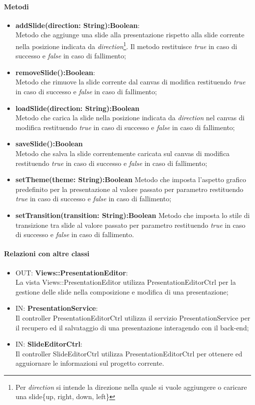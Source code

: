 	\paragraph{Metodi}
	\begin{itemize}
		\item \textbf{addSlide(direction: String):Boolean}:\\
			Metodo che aggiunge una slide alla presentazione rispetto alla slide corrente nella posizione indicata da \textit{direction}\footnote{Per \textit{direction} si intende la direzione nella quale si vuole aggiungere o caricare una slide\{up, right, down, left\}}. Il metodo restituisce \textit{true} in caso di successo e \textit{false} in caso di fallimento;
		\item \textbf{removeSlide():Boolean}:\\
			Metodo che rimuove la slide corrente dal canvas di modifica restituendo \textit{true} in caso di successo e \textit{false} in caso di fallimento;
		\item \textbf{loadSlide(direction: String):Boolean}\\
			Metodo che carica la slide nella posizione indicata da \textit{direction} nel canvas di modifica restituendo \textit{true} in caso di successo e \textit{false} in caso di fallimento;
		\item \textbf{saveSlide():Boolean}\\
			Metodo che salva la slide correntemente caricata sul canvas di modifica restituendo \textit{true} in caso di successo e \textit{false} in caso di fallimento;
		\item \textbf{setTheme(theme: String):Boolean}
			Metodo che imposta l'aspetto grafico predefinito per la presentazione al valore passato per parametro restituendo \textit{true} in caso di successo e \textit{false} in caso di fallimento;
		\item \textbf{setTransition(transition: String):Boolean}
			Metodo che imposta lo stile di transizione tra slide al valore passato per parametro restituendo \textit{true} in caso di successo e \textit{false} in caso di fallimento.
	\end{itemize}
	\paragraph{Relazioni con altre classi}
	\begin{itemize}
	  \item OUT: \textbf{Views::PresentationEditor}:\\
		La vista Views::PresentationEditor utilizza PresentationEditorCtrl per la gestione delle slide nella composizione e modifica di una presentazione;	
	  \item IN: \textbf{PresentationService}:\\
	  	Il controller PresentationEditorCtrl utilizza il servizio PresentationService per il recupero ed il salvataggio di una presentazione interagendo con il back-end;
	  \item IN: \textbf{SlideEditorCtrl}:\\
	  	Il controller SlideEditorCtrl utilizza PresentationEditorCtrl per ottenere ed agguiornare le informazioni sul progetto corrente.
	\end{itemize}  
\newpage
